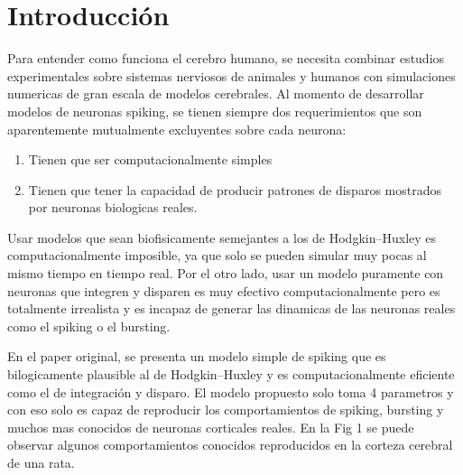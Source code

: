 \documentclass[12pt]{article}
\begin{document}
\section{Introducción}
Para entender como funciona el cerebro humano, se necesita combinar estudios experimentales sobre sistemas nerviosos de animales y humanos con simulaciones numericas de gran escala de modelos cerebrales.
Al momento de desarrollar modelos de neuronas spiking, se tienen siempre dos requerimientos que son aparentemente mutualmente excluyentes sobre cada neurona:
\begin{enumerate}
    \item Tienen que ser computacionalmente simples
    \item Tienen que tener la capacidad de producir patrones de disparos mostrados por neuronas biologicas reales.
\end{enumerate}

Usar modelos que sean biofisicamente semejantes a los de Hodgkin–Huxley es computacionalmente imposible, ya que solo se pueden simular muy pocas al mismo tiempo en tiempo real. Por el otro lado, usar un modelo
puramente con neuronas que integren y disparen es muy efectivo computacionalmente pero es totalmente irrealista y es incapaz de generar las dinamicas de las neuronas reales como el spiking o el bursting.

En el paper original, se presenta un modelo simple de spiking que es bilogicamente plausible al de Hodgkin–Huxley y es computacionalmente eficiente como el de integración y disparo.
El modelo propuesto solo toma 4 parametros y con eso solo es capaz de reproducir los comportamientos de spiking, bursting y muchos mas conocidos de neuronas corticales reales. En la Fig 1 se puede observar
algunos comportamientos conocidos reproducidos en la corteza cerebral de una rata. \\ \\

\newpage
\end{document}
